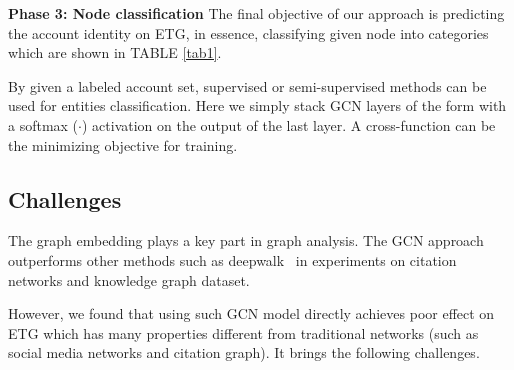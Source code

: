 





\textbf{Phase 3: Node classification}
The final objective of our approach is predicting the account identity on ETG, in essence, classifying given node into categories which are shown in TABLE \ref{tab1}.

By given a labeled account set, supervised or semi-supervised methods can be used for entities classification. Here we simply stack GCN layers of the form with a softmax ($\cdot$) activation on the output of the last layer. A cross-function can be the minimizing objective for training. 

\subsection{Challenges}
\label{section:time}
The graph embedding plays a key part in graph analysis. The GCN approach \cite{kipf2016semi} outperforms other methods such as deepwalk~\cite{perozzi2014deepwalk} in experiments on citation networks and knowledge graph dataset. 

However, we found that using such GCN model directly achieves poor effect on ETG which has many properties different from traditional networks (such as social media networks and citation graph). It brings the following challenges.



